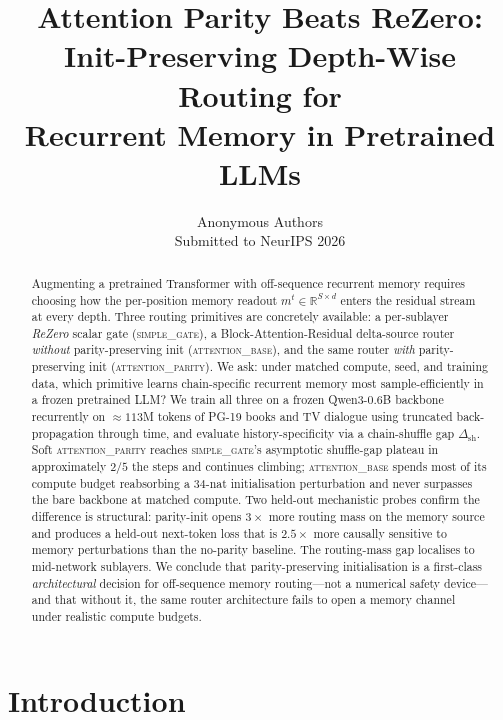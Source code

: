 \documentclass{article}
\title{Attention Parity Beats ReZero:\\
       Init-Preserving Depth-Wise Routing for\\
       Recurrent Memory in Pretrained LLMs}
\author{%
  Anonymous Authors\\
  Submitted to NeurIPS 2026\\
  \texttt{}%
}
\newcommand{\dsh}{\Delta_{\text{sh}}}
\begin{document}
\maketitle

\begin{abstract}
Augmenting a pretrained Transformer with off-sequence recurrent memory
requires choosing how the per-position memory readout
$m^t \in \mathbb{R}^{S\times d}$ enters the residual stream at every
depth.  Three routing primitives are concretely available:
a per-sublayer \emph{ReZero} scalar gate (\textsc{simple\_gate}),
a Block-Attention-Residual delta-source router \emph{without}
parity-preserving init (\textsc{attention\_base}), and the same router
\emph{with} parity-preserving init (\textsc{attention\_parity}).
We ask: under matched compute, seed, and training data, which
primitive learns chain-specific recurrent memory most
sample-efficiently in a frozen pretrained LLM?
We train all three on a frozen Qwen3-0.6B backbone recurrently on
${\approx}113$M tokens of PG-19 books and TV dialogue using truncated
back-propagation through time, and evaluate history-specificity via
a chain-shuffle gap $\dsh$.
Soft \textsc{attention\_parity} reaches \textsc{simple\_gate}'s
asymptotic shuffle-gap plateau in approximately $2/5$ the steps and
continues climbing; \textsc{attention\_base} spends most of its
compute budget reabsorbing a $34$-nat initialisation perturbation and
never surpasses the bare backbone at matched compute.  Two held-out
mechanistic probes confirm the difference is structural:
parity-init opens $3\times$ more routing mass on the memory source
and produces a held-out next-token loss that is $2.5\times$ more
causally sensitive to memory perturbations than the no-parity
baseline.  The routing-mass gap localises to mid-network sublayers.
We conclude that parity-preserving initialisation is a first-class
\emph{architectural} decision for off-sequence memory routing---not a
numerical safety device---and that without it, the same router
architecture fails to open a memory channel under realistic compute
budgets.
\end{abstract}


\section{Introduction}
\label{sec:intro}
\end{document}
